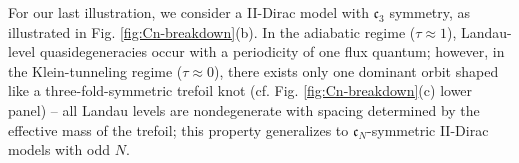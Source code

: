 \documentclass[aps, prb, showpacs, twocolumn, notitlepage, superscriptaddress]{revtex4-1}
\begin{document}

















For our last illustration, we consider a II-Dirac model with $\mathfrak{c}_3$  symmetry, as   illustrated in Fig. \ref{fig:Cn-breakdown}(b). In the adiabatic regime ($\tau{\approx}1$), Landau-level quasidegeneracies occur with a periodicity of one flux quantum; however, in the Klein-tunneling regime ($\tau{\approx}0$), there exists only one dominant orbit shaped like a three-fold-symmetric trefoil knot (cf. Fig. \ref{fig:Cn-breakdown}(c) lower panel) --  all Landau levels are nondegenerate with spacing determined by the effective mass of the trefoil; this property generalizes to $\mathfrak{c}_N$-symmetric II-Dirac models with odd $N$.   
\end{document}
